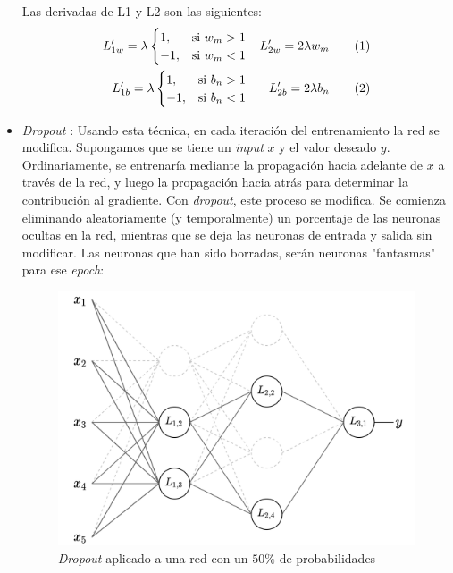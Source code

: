 \begin{itemize}
    Las derivadas de L1 y L2 son las siguientes:
    \begin{align*}
         L'_{1w} = \lambda \begin{cases} 1,& \text{si } w_m > 1\\ -1,& \text{si } w_m < 1\end{cases} && L'_{2w} =  2\lambda w_m \addtocounter{equation}{1}\tag{\theequation} \\ 
         L'_{1b} =  \lambda \begin{cases} 1,& \text{si } b_n > 1\\ -1,& \text{si } b_n < 1\end{cases} && L'_{2b} = 2\lambda b_n \addtocounter{equation}{1}\tag{\theequation}
    \end{align*}
    
    \item \textit{Dropout} \label{dropout}: Usando esta técnica, en cada iteración del entrenamiento la red se modifica. Supongamos que se tiene un \textit{input} $x$ y el valor deseado $y$. Ordinariamente, se entrenaría mediante la propagación hacia adelante de $x$ a través de la red, y luego la propagación hacia atrás para determinar la contribución al gradiente. Con \textit{dropout}, este proceso se modifica. Se comienza eliminando aleatoriamente (y temporalmente) un porcentaje de las neuronas ocultas en la red, mientras que se deja las neuronas de entrada y salida sin modificar. Las neuronas que han sido borradas, serán neuronas "fantasmas" para ese \textit{epoch}:
    
    \begin{figure}[H]
        \centering
        \includegraphics[width=12cm]{images/state-of-art/overfitting/dropout-1.png}
        \caption{\textit{Dropout} aplicado a una red con un $50\%$  de probabilidades}
        \label{fig:basic_network}
    \end{figure}
    

\end{itemize}
